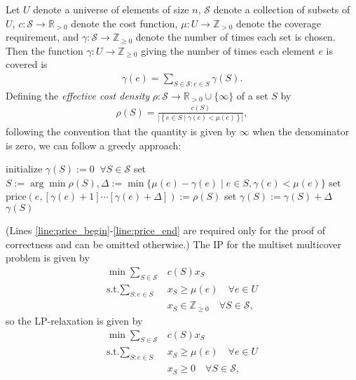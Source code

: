 \documentclass[a4paper,11pt]{article}
\begin{document}
Let $U$ denote a universe of elements of size $n$, $\mathcal{S}$ denote a collection of subsets of $U$, $c : \mathcal{S} \to \mathbb{R}_{> 0}$ denote the cost function, $\mu : U \to \mathbb{Z}_{> 0}$ denote the coverage requirement, and $\gamma : \mathcal{S} \to \mathbb{Z}_{\geq 0}$ denote the number of times each set is chosen. Then the function $\gamma : U \to \mathbb{Z}_{\geq 0}$ giving the number of times each element $e$ is covered is
\begin{align*}
    \gamma(e) = \sum_{S \in \mathcal{S} : e \in S} \gamma(S).
\end{align*}
Defining the \emph{effective cost density} $\rho : \mathcal{S} \to \mathbb{R}_{> 0} \cup \{\infty\}$ of a set $S$ by
\begin{align*}
    \rho(S) = \frac{c(S)}{\left| \left\{ e \in S \mid \gamma(e) < \mu(e) \right\} \right|},
\end{align*}
following the convention that the quantity is given by $\infty$ when the denominator is zero, we can follow a greedy approach:
\begin{algorithm}[H] {\begin{algorithmic}[1]
        \State initialize $\gamma(S) := 0 \;\; \forall S \in \mathcal{S}$
            \State set $S := \arg\min \rho(S), \Delta := \min\{ \mu(e) - \gamma(e) \mid e \in S, \gamma(e) < \mu(e) \}$
             \label{line:price_begin}
                \State set $\text{price}(e, [\gamma(e) + 1] \cdots [\gamma(e) + \Delta]) := \rho(S)$
            \EndFor \label{line:price_end}
            \State set $\gamma(S) := \gamma(S) + \Delta$
        \EndWhile
        \State \Return $\gamma(S)$
\end{algorithmic}} \end{algorithm}
(Lines \ref{line:price_begin}-\ref{line:price_end} are required only for the proof of correctness and can be omitted otherwise.) The IP for the multiset multicover problem is given by
\begin{align*}
    \min \sum_{S \in \mathcal{S}} &c(S) x_S \\
    \text{s.t.} \sum_{S : e \in S} &x_S \geq \mu(e) \quad \forall e \in U \\
    &x_S \in \mathbb{Z}_{\geq 0} \quad \forall S \in \mathcal{S},
\end{align*}
so the LP-relaxation is given by
\begin{align*}
    \min \sum_{S \in \mathcal{S}} &c(S) x_S \\
    \text{s.t.} \sum_{S : e \in S} &x_S \geq \mu(e) \quad \forall e \in U \\
    &x_S \geq 0 \quad \forall S \in \mathcal{S},
\end{align*}
\end{document}
